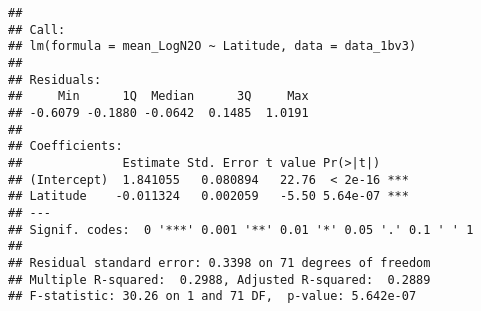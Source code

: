 \documentclass[
]{article}
\newenvironment{Shaded}{\begin{snugshade}}{\end{snugshade}}
\newcommand{\FunctionTok}[1]{\textcolor[rgb]{0.13,0.29,0.53}{\textbf{#1}}}
\newcommand{\NormalTok}[1]{#1}
\newcommand{\OtherTok}[1]{\textcolor[rgb]{0.56,0.35,0.01}{#1}}
\newcommand{\SpecialCharTok}[1]{\textcolor[rgb]{0.81,0.36,0.00}{\textbf{#1}}}
\begin{document}
\begin{verbatim}
## 
## Call:
## lm(formula = mean_LogN2O ~ Latitude, data = data_1bv3)
## 
## Residuals:
##     Min      1Q  Median      3Q     Max 
## -0.6079 -0.1880 -0.0642  0.1485  1.0191 
## 
## Coefficients:
##              Estimate Std. Error t value Pr(>|t|)    
## (Intercept)  1.841055   0.080894   22.76  < 2e-16 ***
## Latitude    -0.011324   0.002059   -5.50 5.64e-07 ***
## ---
## Signif. codes:  0 '***' 0.001 '**' 0.01 '*' 0.05 '.' 0.1 ' ' 1
## 
## Residual standard error: 0.3398 on 71 degrees of freedom
## Multiple R-squared:  0.2988, Adjusted R-squared:  0.2889 
## F-statistic: 30.26 on 1 and 71 DF,  p-value: 5.642e-07
\end{verbatim}

\begin{Shaded}
\end{Shaded}
\end{document}

